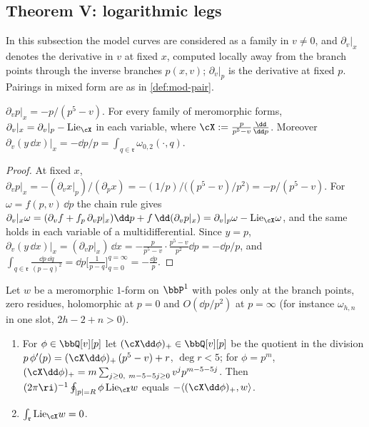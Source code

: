 \subsection{Theorem V: logarithmic legs}
\label{sec:mod-V}

In this subsection the model curves are considered as a family in $v\neq 0$, and $\partial_v|_x$ denotes the derivative in $v$ at fixed $x$, computed locally away from the branch points through the inverse branches $p(x,v)$; $\partial_v|_p$ is the derivative at fixed $p$. Pairings in mixed form are as in \cref{def:mod-pair}.

\begin{lem}
\label{lem:mod-fixedx}
$\partial_vp|_x=-p/(p^5-v)$. For every family of meromorphic forms, $\partial_v|_x=\partial_v|_p-\mathrm{Lie}_{\cX}$ in each variable, where $\cX:=\frac{p}{p^5-v}\frac{\dd}{\dd p}$. Moreover $\partial_v(y\,\dd x)|_x=-\dd p/p=\int_{q\in\mathfrak r}\omega_{0,2}(\cdot,q)$.
\end{lem}

\begin{proof}
At fixed $x$, $\partial_vp|_x=-(\partial_vx|_p)/(\partial_px)=-(1/p)\big/\big((p^5-v)/p^2\big)=-p/(p^5-v)$. For $\omega=f(p,v)\,\dd p$ the chain rule gives $\partial_v|_x\omega=(\partial_vf+f_p\,\partial_vp|_x)\dd p+f\,\dd(\partial_vp|_x)=\partial_v|_p\omega-\mathrm{Lie}_{\cX}\omega$, and the same holds in each variable of a multidifferential. Since $y=p$, $\partial_v(y\,\dd x)|_x=(\partial_vp|_x)\,\dd x=-\frac{p}{p^5-v}\cdot\frac{p^5-v}{p^2}\dd p=-\dd p/p$, and $\int_{q\in\mathfrak r}\frac{\dd p\,\dd q}{(p-q)^2}=\dd p\Big[\frac{1}{p-q}\Big]_{q=0}^{q=\infty}=-\frac{\dd p}{p}$.
\end{proof}

\begin{lem}
\label{lem:mod-ibp}
Let $w$ be a meromorphic $1$-form on $\bbP^1$ with poles only at the branch points, zero residues, holomorphic at $p=0$ and $O(\dd p/p^2)$ at $p=\infty$ (for instance $\omega_{h,n}$ in one slot, $2h-2+n>0$).
\begin{enumerate}
\item For $\phi\in\bbQ[v][p]$ let $(\cX\dd\phi)_+\in\bbQ[v][p]$ be the quotient in the division $p\,\phi'(p)=(\cX\dd\phi)_+\,(p^5-v)+r$, $\deg r<5$; for $\phi=p^m$, $(\cX\dd\phi)_+=m\sum_{j\geq 0,\ m-5-5j\geq 0}v^jp^{m-5-5j}$. Then $(2\pi\ri)^{-1}\oint_{|p|=R}\phi\,\mathrm{Lie}_{\cX}w$ equals $-\langle(\cX\dd\phi)_+,w\rangle$.
\item $\int_{\mathfrak r}\mathrm{Lie}_{\cX}w=0$.
\end{enumerate}
\end{lem}

